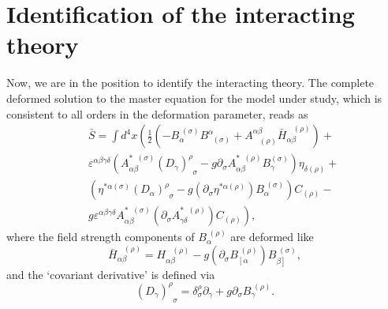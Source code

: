 \documentclass[a4paper,12pt]{article}
\begin{document}
\section{Identification of the interacting theory}

Now, we are in the position to identify the interacting theory. The complete
deformed solution to the master equation for the model under study, which is
consistent to all orders in the deformation parameter, reads as 
\begin{eqnarray}
&&\bar{S}=\int d^{4}x\left( \frac{1}{2}\left( -B_{\alpha }^{\;(\sigma
)}B_{\;\;(\sigma )}^{\alpha }+A_{\;\;\;(\rho )}^{\alpha \beta }\bar{H}%
_{\alpha \beta }^{\;\;\;(\rho )}\right) +\right.  \nonumber \\
&&\varepsilon ^{\alpha \beta \gamma \delta }\left( A_{\alpha \beta
}^{*\;\;(\sigma )}\left( D_{\gamma }\right) _{\;\;\sigma }^{\rho }-g\partial
_{\sigma }A_{\alpha \beta }^{*\;\;(\rho )}B_{\gamma }^{(\sigma )}\right)
\eta _{\delta (\rho )}+  \nonumber \\
&&\left( \eta ^{*\alpha (\sigma )}\left( D_{\alpha }\right) _{\;\;\sigma
}^{\rho }-g\left( \partial _{\sigma }\eta ^{*\alpha (\rho )}\right)
B_{\alpha }^{\;(\sigma )}\right) C_{(\rho )}-  \nonumber \\
&&\left. g\varepsilon ^{\alpha \beta \gamma \delta }A_{\alpha \beta
}^{*\;\;(\sigma )}\left( \partial _{\sigma }A_{\gamma \delta }^{*\;\;(\rho
)}\right) C_{(\rho )}\right) ,  \label{fcola42}
\end{eqnarray}
where the field strength components of $B_{\alpha }^{\;(\rho )}$ are
deformed like 
\begin{equation}
\bar{H}_{\alpha \beta }^{\;\;\;(\rho )}=H_{\alpha \beta }^{\;\;\;(\rho
)}-g\left( \partial _{\sigma }B_{\left[ \alpha \right. }^{\;(\rho )}\right)
B_{\left. \beta \right] }^{\;(\sigma )},  \label{fcola43}
\end{equation}
and the `covariant derivative' is defined via 
\begin{equation}
\left( D_{\gamma }\right) _{\;\;\sigma }^{\rho }=\delta _{\sigma }^{\rho
}\partial _{\gamma }+g\partial _{\sigma }B_{\gamma }^{\;(\rho )}.
\label{fcola44}
\end{equation}
\end{document}
